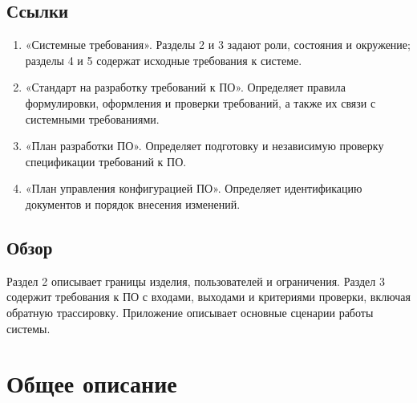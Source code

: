 \documentclass{tpks}
\begin{document}
\subsection{Ссылки}
\begin{enumerate}
\item «Системные требования». Разделы 2 и 3 задают роли, состояния и окружение; разделы 4 и 5 содержат исходные требования к системе.
\item «Стандарт на разработку требований к ПО». Определяет правила формулировки, оформления и проверки требований, а также их связи с системными требованиями.
\item «План разработки ПО». Определяет подготовку и независимую проверку спецификации требований к ПО.
\item «План управления конфигурацией ПО». Определяет идентификацию документов и порядок внесения изменений.
\end{enumerate}
\subsection{Обзор}
Раздел 2 описывает границы изделия, пользователей и ограничения. Раздел 3 содержит требования к ПО с входами, выходами и критериями проверки, включая обратную трассировку. Приложение описывает основные сценарии работы системы.

\section{Общее описание}
\end{document}
